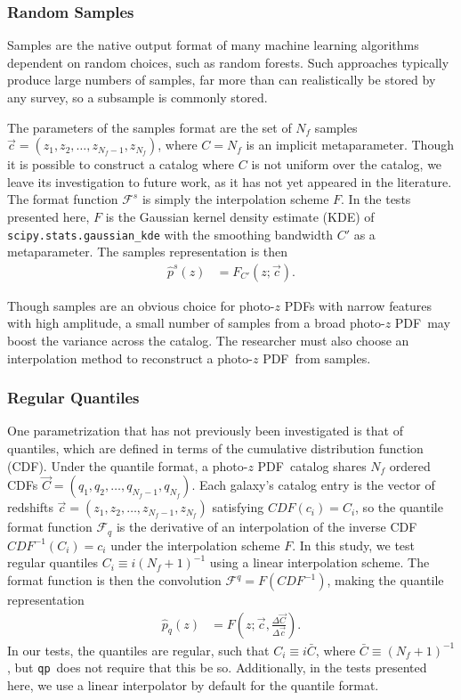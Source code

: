 \documentclass[\docopts]{\docclass}
\newcommand{\qp}{\texttt{qp}}
\newcommand{\pz}{photo-$z$ PDF}
\begin{document}
\subsubsection{Random Samples}
\label{sec:samples}

Samples are the native output format of many machine learning algorithms
dependent on random choices, such as random forests.
Such approaches typically produce large numbers of samples, far more than can
realistically be stored by any survey, so a subsample is commonly stored.

The parameters of the samples format are the set of $N_{f}$ samples
$\vec{c}=(z_{1}, z_{2}, \dots, z_{N_{f}-1}, z_{N_{f}})$, where $C=N_{f}$ is an
implicit metaparameter.  Though it is possible to construct a catalog where $C$
is not uniform over the catalog, we leave its investigation to future work, as
it has not yet appeared in the literature.  The format function
$\mathcal{F}^{s}$ is simply the interpolation scheme $F$.  In the tests
presented here, $F$ is the Gaussian kernel density estimate (KDE) of
\texttt{scipy.stats.gaussian\_kde} with the smoothing bandwidth $C'$ as a
metaparameter.  The samples representation is then
\begin{align}
  \label{eq:sampled}
  \hat{p}^{s}(z) &= F_{C'}(z; \vec{c}).
\end{align}

Though samples are an obvious choice for \pz s with narrow features with high
amplitude, a small number of samples from a broad \pz\ may boost the variance
across the catalog.  The researcher must also choose an interpolation method to
reconstruct a \pz\ from samples.

\subsubsection{Regular Quantiles}
\label{sec:quantiles}

One parametrization that has not previously been investigated is that of
quantiles, which are defined in terms of the cumulative distribution function
(CDF).  Under the quantile format, a \pz\ catalog shares $N_{f}$ ordered CDFs
$\vec{C}=(q_{1}, q_{2}, \dots, q_{N_{f}-1}, q_{N_{f}})$.  Each galaxy's catalog
entry is the vector of redshifts $\vec{c}=(z_{1}, z_{2}, \dots, z_{N_{f}-1},
z_{N_{f}})$ satisfying $CDF(c_{i})=C_{i}$, so the quantile format function
$\mathcal{F}_{q}$ is the derivative of an interpolation of the inverse CDF
$CDF^{-1}(C_{i})=c_{i}$ under the interpolation scheme $F$.  In this study, we
test regular quantiles $C_{i}\equiv i(N_{f}+1)^{-1}$ using a linear
interpolation scheme.  The format function is then the convolution
$\mathcal{F}^{q}=F(CDF^{-1})$, making the quantile representation
\begin{align}
  \label{eq:quantiles}
  \hat{p}_{q}(z) &= F(z; \vec{c}, \frac{\Delta\vec{C}}{\Delta\vec{c}}).
\end{align}
In our tests, the quantiles are regular, such that $C_{i}\equiv i\bar{C}$,
where $\bar{C}\equiv(N_{f}+1)^{-1}$, but \qp\ does not require that this be so.
 Additionally, in the tests presented here, we use a linear interpolator by
default for the quantile format.
\end{document}
